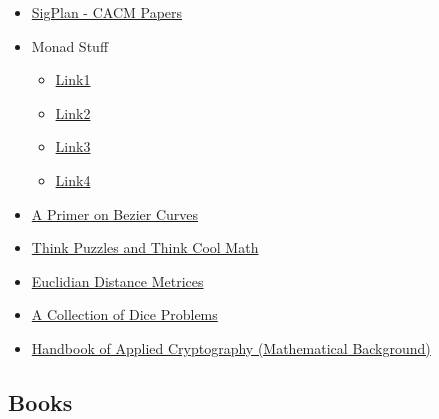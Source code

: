 \begin{itemize}
	\item \href{http://www.sigplan.org/Newsletters/CACM/Papers/}{SigPlan - CACM
	Papers}

	\item Monad Stuff

	\begin{itemize}
		\item
		\href{http://bartoszmilewski.com/2015/05/11/using-monads-in-c-to-solve-constraints-1-the-list-monad/}{Link1}
		\item
		\href{http://blog.jle.im/entry/unique-sample-drawing-searches-with-list-and-statet}{Link2}
		\item
		\href{http://www.berniepope.id.au/docs/scala_monads.pdf}{Link3}
		\item
		\href{http://james-iry.blogspot.co.at/2007/10/monads-are-elephants-part-3.html}{Link4}
	\end{itemize}

	\item \href{https://pomax.github.io/bezierinfo/}{A Primer on Bezier Curves}

	\item \href{http://www.jamestanton.com/?category_name=puzzles}{Think Puzzles and Think Cool Math}
	
	\item \href{files/1502.07541.pdf}{Euclidian Distance Metrices}

	\item \href{dice1.pdf}{A Collection of Dice Problems}

	\item \href{Handbook of Applied Cryptography - Chapter02.pdf}{Handbook of Applied Cryptography (Mathematical Background)}

\end{itemize}

\subsection{Books}

